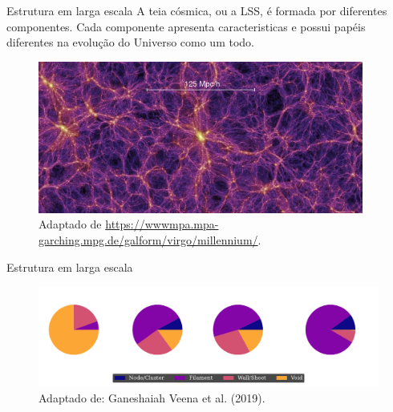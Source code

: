 \begin{frame}[c]{Estrutura em larga escala}
    A teia cósmica, ou a LSS, é formada por diferentes componentes. Cada componente apresenta caracteristicas e possui papéis diferentes na evolução do Universo como um todo.

    \begin{figure}
        \centering
        \includegraphics[height=5cm]{script/images/millenium.png}
        \caption{Adaptado de \url{https://wwwmpa.mpa-garching.mpg.de/galform/virgo/millennium/}.}
    \end{figure}

                
                
                
\end{frame}

\begin{frame}[c]{Estrutura em larga escala}
    \begin{figure}
        \centering
        \includegraphics[width=\linewidth]{script/images/lss_distribution.pdf}
        \caption{Adaptado de: Ganeshaiah Veena et al. (2019).}
    \end{figure}
\end{frame}

